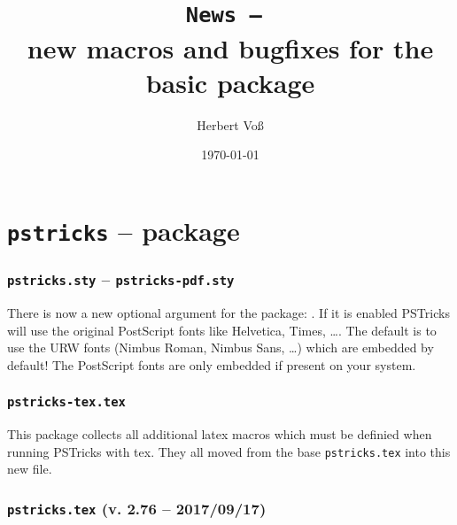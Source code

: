 \documentclass[11pt,english,BCOR=10mm,DIV=12,bibliography=totoc,parskip=false,headings=small,
    headinclude=false,footinclude=false,twoside]{pst-doc}
\begin{document}
\title{\texttt{News -- \the\year}\\ \Large new macros and bugfixes for the
basic package }
\author{Herbert Voß}
\date{\today}

\maketitle

\clearpage
\tableofcontents

\clearpage
\part{\texttt{pstricks} -- package}

\section{\texttt{pstricks.sty} -- \texttt{pstricks-pdf.sty}}

There is now a new optional argument for the package: . If it is
enabled PSTricks will use the original PostScript fonts like Helvetica, Times, \ldots.
The default is to use the URW fonts (Nimbus Roman, Nimbus Sans, \ldots) which are embedded by default!
The PostScript fonts are only embedded if present on your system.
 
\section{\texttt{pstricks-tex.tex}}
This package collects all additional latex macros which must be definied
when running PSTricks with tex.  They all moved from the base \texttt{pstricks.tex} into
this new file.


\section{\texttt{pstricks.tex} (v. 2.76 -- 2017/09/17)}
\end{document}

